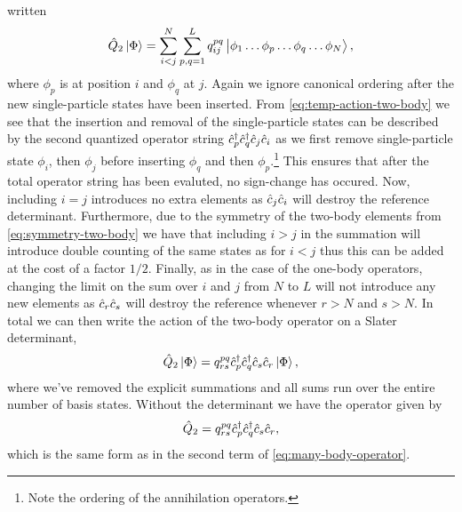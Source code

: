         written
        \begin{align}
            \hat{Q}_2\ket{\Phi}
            = \sum_{i < j}^{N}\sum_{p, q = 1}^{L}
            q^{pq}_{ij}\ket{\phi_1\dots\phi_p\dots\phi_q\dots\phi_N},
            \label{eq:temp-action-two-body}
        \end{align}
        where $\phi_p$ is at position $i$ and $\phi_q$ at $j$.
        Again we ignore canonical ordering after the new single-particle states
        have been inserted.
        From \autoref{eq:temp-action-two-body} we see that the insertion and
        removal of the single-particle states can be described by the second
        quantized operator string $\hat{c}_{p}^{\dagger}\hat{c}_{q}^{\dagger}\hat{c}_{j}\hat{c}_{i}$ as we first
        remove single-particle state $\phi_i$, then $\phi_j$ before inserting
        $\phi_q$ and then $\phi_p$.\footnote{%
            Note the ordering of the annihilation operators.
        }
        This ensures that after the total operator string has been evaluted, no
        sign-change has occured.
        Now, including $i = j$ introduces no extra elements as $\hat{c}_{j}\hat{c}_{i}$
        will destroy the reference determinant.
        Furthermore, due to the symmetry of the two-body elements from
        \autoref{eq:symmetry-two-body} we have that including $i > j$ in the
        summation will introduce double counting of the same states as for $i <
        j$ thus this can be added at the cost of a factor $1/2$.
        Finally, as in the case of the one-body operators, changing the limit on
        the sum over $i$ and $j$ from $N$ to $L$ will not introduce any new
        elements as $\hat{c}_{r}\hat{c}_{s}$ will destroy the reference whenever $r > N$
        and $s > N$.
        In total we can then write the action of the two-body operator on a
        Slater determinant,
        \begin{align}
            \hat{Q}_2\ket{\Phi}
            = q^{pq}_{rs} \hat{c}_{p}^{\dagger}\hat{c}_{q}^{\dagger}\hat{c}_{s}\hat{c}_{r}\ket{\Phi},
        \end{align}
        where we've removed the explicit summations and all sums run over the
        entire number of basis states.
        Without the determinant we have the operator given by
        \begin{align}
            \hat{Q}_2
            = q^{pq}_{rs}\hat{c}_{p}^{\dagger}\hat{c}_{q}^{\dagger}\hat{c}_{s}\hat{c}_{r},
        \end{align}
        which is the same form as in the second term of
        \autoref{eq:many-body-operator}.

